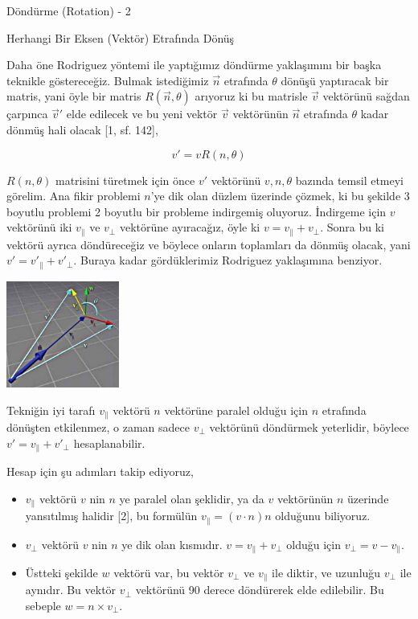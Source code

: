 \documentclass[12pt,fleqn]{article}\usepackage{../../common}
\begin{document}
Döndürme (Rotation) - 2

Herhangi Bir Eksen (Vektör) Etrafında Dönüş

Daha öne Rodriguez yöntemi ile yaptığımız döndürme yaklaşımını bir başka
teknikle göstereceğiz. Bulmak istediğimiz $\vec{n}$ etrafında $\theta$ dönüşü
yaptıracak bir matris, yani öyle bir matris $R(\vec{n},\theta)$ arıyoruz ki bu
matrisle $\vec{v}$ vektörünü sağdan çarpınca $\vec{v}'$ elde edilecek ve bu yeni
vektör $\vec{v}$ vektörünün $\vec{n}$ etrafında $\theta$ kadar dönmüş hali
olacak [1, sf. 142],

$$
v' = v R(n,\theta)
$$

$R(n,\theta)$ matrisini türetmek için önce $v'$ vektörünü $v,n,\theta$ bazında
temsil etmeyi görelim. Ana fikir problemi $n$'ye dik olan düzlem üzerinde
çözmek, ki bu şekilde 3 boyutlu problemi 2 boyutlu bir probleme indirgemiş
oluyoruz. İndirgeme için $v$ vektörünü iki $v_\parallel$ ve $v_\perp$ vektörüne
ayıracağız, öyle ki $v = v_\parallel + v_\perp$. Sonra bu ki vektörü ayrıca
döndüreceğiz ve böylece onların toplamları da dönmüş olacak, yani $v' =
v'_\parallel + v'_\perp$. Buraya kadar gördüklerimiz Rodriguez yaklaşımına
benziyor.

\includegraphics[width=10em]{phy_073_rot_01.jpg}

Tekniğin iyi tarafı $v_\parallel$ vektörü $n$ vektörüne paralel olduğu için $n$
etrafında dönüşten etkilenmez, o zaman sadece $v_\perp$ vektörünü döndürmek
yeterlidir, böylece $v' = v_\parallel + v'_\perp$ hesaplanabilir.

Hesap için şu adımları takip ediyoruz,

\begin{itemize}
   \item $v_\parallel$ vektörü $v$ nin $n$ ye paralel olan şeklidir, ya da
     $v$ vektörünün $n$ üzerinde yansıtılmış halidir [2], bu formülün
     $v_\parallel = (v \cdot n) n$ olduğunu biliyoruz.
   \item $v_\perp$ vektörü $v$ nin $n$ ye dik olan kısmıdır.
     $v = v_\parallel + v_\perp$ olduğu için $v_\perp = v - v_\parallel$.
   \item Üstteki şekilde $w$ vektörü var, bu vektör $v_\perp$ ve $v_\parallel$
     ile diktir, ve uzunluğu $v_\perp$ ile aynıdır. Bu vektör $v_\perp$
     vektörünü 90 derece döndürerek elde edilebilir. Bu sebeple $w = n \times v_\perp$.
     
\end{itemize}
\end{document}
